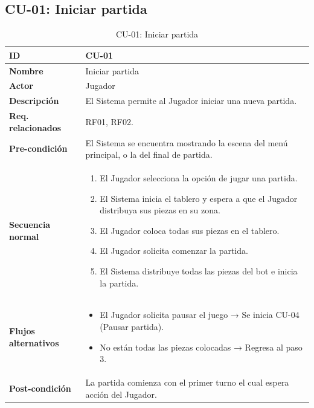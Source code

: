 
\subsection{CU-01: Iniciar partida}

\begin{table}[H]
	\centering
	\begin{tabular}{|p{3cm}|p{14cm}|}
		\hline \textbf{ID} & CU-01 \\
		\hline \textbf{Nombre} & Iniciar partida \\
		\hline \textbf{Actor} & Jugador \\
		\hline \textbf{Descripción} & El Sistema permite al Jugador iniciar una nueva partida. \\
		\hline \textbf{Req. relacionados} & RF01, RF02.\\
		\hline \textbf{Pre-condición} & El Sistema se encuentra mostrando la escena del menú principal, o la del final de partida.\\
		\hline
		\textbf{Secuencia normal} &
		\begin{enumerate}[nosep, before=\vspace{-0.4\baselineskip}]
			\item El Jugador selecciona la opción de jugar una partida.
			\item El Sistema inicia el tablero y espera a que el Jugador distribuya sus piezas en su zona.
			\item El Jugador coloca todas sus piezas en el tablero.
			\item El Jugador solicita comenzar la partida.
			\item El Sistema distribuye todas las piezas del bot e inicia la partida.
		\end{enumerate} \\
		\hline
		\textbf{Flujos alternativos} &
		\begin{itemize}[nosep, before=\vspace{-0.4\baselineskip}]
			\item [{3.a.}] El Jugador solicita pausar el juego → Se inicia CU-04 (Pausar partida).
			\item [{4.a.}] No están todas las piezas colocadas → Regresa al paso 3.
		\end{itemize} \\
		\hline \textbf{Post-condición} & La partida comienza con el primer turno el cual espera acción del Jugador. \\
		\hline
	\end{tabular}
	\caption{CU-01: Iniciar partida}
	\label{tab:cu01}
\end{table}

